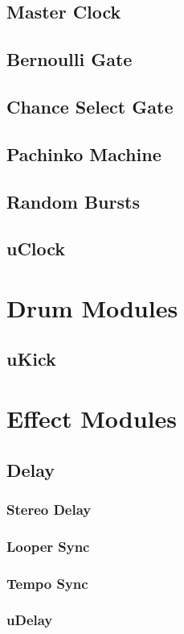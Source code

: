 \documentclass[11pt]{book}
\begin{document}
\section{Master Clock}
\section{Bernoulli Gate}
\section{Chance Select Gate}
\section{Pachinko Machine}
\section{Random Bursts}
\section{uClock}

\chapter{Drum Modules}
\section{uKick}

\chapter{Effect Modules}
\section{Delay}
\subsection{Stereo Delay}
\subsection{Looper Sync}
\subsection{Tempo Sync}
\subsection{uDelay}
\end{document}
